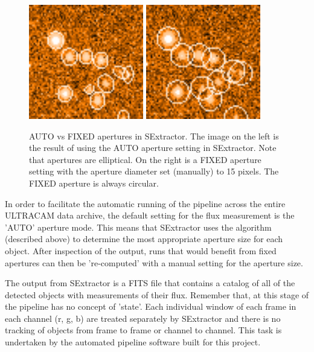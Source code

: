 \begin{enumerate}
\begin{figure}
  \centering
  \includegraphics[width=50mm]{images/sex_apertures_auto_cropped.png}
  \includegraphics[width=50mm]{images/sex_apertures_fixed_cropped.png}
  \caption{AUTO vs FIXED apertures in SExtractor. The image on the left is the result of using the AUTO aperture setting in SExtractor. Note that apertures are elliptical. On the right is a FIXED aperture setting with the aperture diameter set (manually) to 15 pixels. The FIXED aperture is always circular.}
\label{fig:fixedautoapertures}
\end{figure}
\end{enumerate}

In order to facilitate the automatic running of the pipeline across the entire ULTRACAM data archive, the default setting for the flux measurement is the 'AUTO' aperture mode. This means that SExtractor uses the algorithm (described above) to determine the most appropriate aperture size for each object. After inspection of the output, runs that would benefit from fixed apertures can then be 're-computed' with a manual setting for the aperture size. 

The output from SExtractor is a FITS file that contains a catalog of all of the detected objects with measurements of their flux. Remember that, at this stage of the pipeline has no concept of 'state'. Each individual window of each frame in each channel (r, g, b) are treated separately by SExtractor and there is no tracking of objects from frame to frame or channel to channel. This task is undertaken by the automated pipeline software built for this project. 


